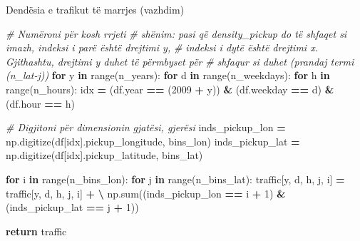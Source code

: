 \documentclass[
  ignorenonframetext,
]{beamer}
\newenvironment{Shaded}{\begin{snugshade}}{\end{snugshade}}
\newcommand{\BuiltInTok}[1]{#1}
\newcommand{\CommentTok}[1]{\textcolor[rgb]{0.56,0.35,0.01}{\textit{#1}}}
\newcommand{\ControlFlowTok}[1]{\textcolor[rgb]{0.13,0.29,0.53}{\textbf{#1}}}
\newcommand{\DecValTok}[1]{\textcolor[rgb]{0.00,0.00,0.81}{#1}}
\newcommand{\KeywordTok}[1]{\textcolor[rgb]{0.13,0.29,0.53}{\textbf{#1}}}
\newcommand{\NormalTok}[1]{#1}
\newcommand{\OperatorTok}[1]{\textcolor[rgb]{0.81,0.36,0.00}{\textbf{#1}}}
\begin{document}
\begin{frame}[fragile]{Dendësia e trafikut të marrjes (vazhdim)}
\protect\hypertarget{denduxebsia-e-trafikut-tuxeb-marrjes-vazhdim}{}

\begin{Shaded}
\begin{Highlighting}[]
    \CommentTok{\# Numëroni për kosh rrjeti}
    \CommentTok{\# shënim: pasi që density\_pickup do të shfaqet si imazh, indeksi i parë është drejtimi y,}
    \CommentTok{\#          indeksi i dytë është drejtimi x. Gjithashtu, drejtimi y duhet të përmbyset për}
    \CommentTok{\#          shfaqur si duhet (prandaj termi (n\_lat{-}j))}
    \ControlFlowTok{for}\NormalTok{ y }\KeywordTok{in} \BuiltInTok{range}\NormalTok{(n\_years):}
        \ControlFlowTok{for}\NormalTok{ d }\KeywordTok{in} \BuiltInTok{range}\NormalTok{(n\_weekdays):}
            \ControlFlowTok{for}\NormalTok{ h }\KeywordTok{in} \BuiltInTok{range}\NormalTok{(n\_hours):}
\NormalTok{                idx }\OperatorTok{=}\NormalTok{ (df.year }\OperatorTok{==}\NormalTok{ (}\DecValTok{2009} \OperatorTok{+}\NormalTok{ y)) }\OperatorTok{\&}\NormalTok{ (df.weekday }\OperatorTok{==}\NormalTok{ d) }\OperatorTok{\&}\NormalTok{ (df.hour }\OperatorTok{==}\NormalTok{ h)}

                \CommentTok{\# Digjitoni për dimensionin gjatësi, gjerësi}
\NormalTok{                inds\_pickup\_lon }\OperatorTok{=}\NormalTok{ np.digitize(df[idx].pickup\_longitude, bins\_lon)}
\NormalTok{                inds\_pickup\_lat }\OperatorTok{=}\NormalTok{ np.digitize(df[idx].pickup\_latitude, bins\_lat)}

                \ControlFlowTok{for}\NormalTok{ i }\KeywordTok{in} \BuiltInTok{range}\NormalTok{(n\_bins\_lon):}
                    \ControlFlowTok{for}\NormalTok{ j }\KeywordTok{in} \BuiltInTok{range}\NormalTok{(n\_bins\_lat):}
\NormalTok{                        traffic[y, d, h, j, i] }\OperatorTok{=}\NormalTok{ traffic[y, d, h, j, i] }\OperatorTok{+} \OperatorTok{\textbackslash{}}
\NormalTok{                                                 np.}\BuiltInTok{sum}\NormalTok{((inds\_pickup\_lon }\OperatorTok{==}\NormalTok{ i }\OperatorTok{+} \DecValTok{1}\NormalTok{) }\OperatorTok{\&}\NormalTok{ (inds\_pickup\_lat }\OperatorTok{==}\NormalTok{ j }\OperatorTok{+} \DecValTok{1}\NormalTok{))}
    
    \ControlFlowTok{return}\NormalTok{ traffic}
\end{Highlighting}
\end{Shaded}
\end{frame}
\end{document}
